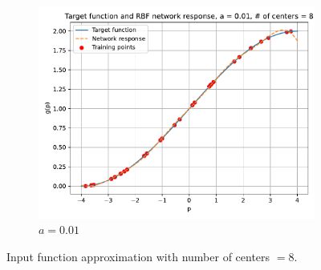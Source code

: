 \begin{figure}[htbp]
\begin{subfigure}{0.33\linewidth}
		\includegraphics[width=\linewidth]{../Problem 2/prob2_response_a_0.01_Cnum_8.pdf}
		\caption{$a=0.01$}
	\end{subfigure}\hfill
	\caption{Input function approximation with number of centers $=8$.}
	\label{fig:prob2_response_8}
\end{figure}

